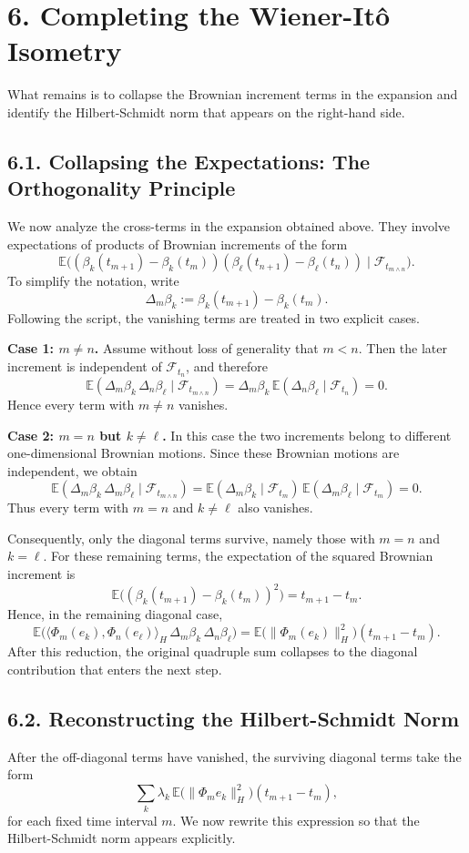 \documentclass[11pt]{article}
\theoremstyle{definition}
\theoremstyle{remark}
\begin{document}
\section*{6. Completing the Wiener-It\^o Isometry}
What remains is to collapse the Brownian increment terms in the expansion and identify the Hilbert-Schmidt norm that appears on the right-hand side.

\subsection*{6.1. Collapsing the Expectations: The Orthogonality Principle}
We now analyze the cross-terms in the expansion obtained above. They involve expectations of products of Brownian increments of the form
\[
\mathbb E\bigl((\beta_k(t_{m+1})-\beta_k(t_m))(\beta_\ell(t_{n+1})-\beta_\ell(t_n))\mid \mathcal F_{t_{m\wedge n}}\bigr).
\]
To simplify the notation, write
\[
\Delta_m\beta_k:=\beta_k(t_{m+1})-\beta_k(t_m).
\]
Following the script, the vanishing terms are treated in two explicit cases.

\textbf{Case 1: \(m\neq n\).} Assume without loss of generality that \(m<n\). Then the later increment is independent of \(\mathcal F_{t_n}\), and therefore
\[
\mathbb E(\Delta_m\beta_k\,\Delta_n\beta_\ell\mid \mathcal F_{t_{m\wedge n}})
=
\Delta_m\beta_k\,\mathbb E(\Delta_n\beta_\ell\mid \mathcal F_{t_n})
=
0.
\]
Hence every term with \(m\neq n\) vanishes.

\textbf{Case 2: \(m=n\) but \(k\neq \ell\).} In this case the two increments belong to different one-dimensional Brownian motions. Since these Brownian motions are independent, we obtain
\[
\mathbb E(\Delta_m\beta_k\,\Delta_m\beta_\ell\mid \mathcal F_{t_{m\wedge n}})
=
\mathbb E(\Delta_m\beta_k\mid \mathcal F_{t_m})\,
\mathbb E(\Delta_m\beta_\ell\mid \mathcal F_{t_m})
=
0.
\]
Thus every term with \(m=n\) and \(k\neq \ell\) also vanishes.

Consequently, only the diagonal terms survive, namely those with \(m=n\) and \(k=\ell\). For these remaining terms, the expectation of the squared Brownian increment is
\[
\mathbb E\bigl((\beta_k(t_{m+1})-\beta_k(t_m))^2\bigr)
=
t_{m+1}-t_m.
\]
Hence, in the remaining diagonal case,
\[
\mathbb E\bigl(\langle \Phi_m(e_k),\Phi_n(e_\ell)\rangle_H\,\Delta_m\beta_k\,\Delta_n\beta_\ell\bigr)
=
\mathbb E\bigl(\|\Phi_m(e_k)\|_H^2\bigr)(t_{m+1}-t_m).
\]
After this reduction, the original quadruple sum collapses to the diagonal contribution that enters the next step.

\subsection*{6.2. Reconstructing the Hilbert-Schmidt Norm}
After the off-diagonal terms have vanished, the surviving diagonal terms take the form
\[
\sum_{k}\lambda_k\,\mathbb E\bigl(\|\Phi_m e_k\|_H^2\bigr)(t_{m+1}-t_m),
\]
for each fixed time interval \(m\). We now rewrite this expression so that the Hilbert-Schmidt norm appears explicitly.
\end{document}
